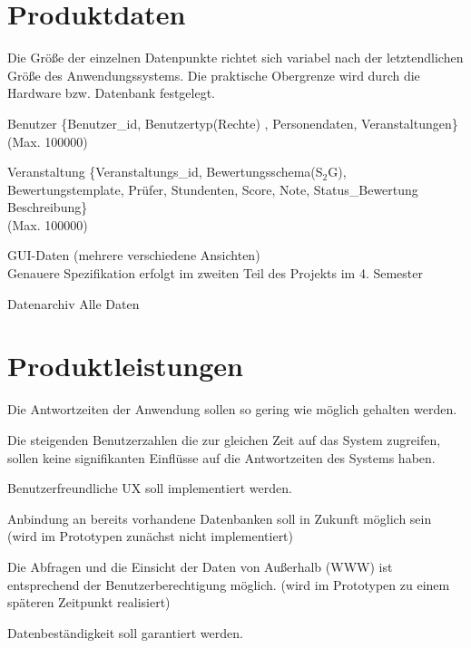 	
	
	\section{Produktdaten}
	
		Die Größe der einzelnen Datenpunkte richtet sich variabel nach der letztendlichen Größe des Anwendungssystems. Die praktische Obergrenze wird durch die Hardware bzw. Datenbank festgelegt. 
	
	\begin{description}
	\item[/D10/] Benutzer \{Benutzer\_id, Benutzertyp(Rechte) , Personendaten, Veranstaltungen\}\\ (Max. 100000) 
	\item[/D20/] Veranstaltung \{Veranstaltungs\_id, Bewertungsschema(S$_2$G), Bewertungstemplate, Prüfer, Stundenten, Score, Note, Status\_Bewertung\, Beschreibung\} \\ (Max. 100000)
	\item[/D30/] GUI-Daten (mehrere verschiedene Ansichten) \\
	Genauere Spezifikation erfolgt im zweiten Teil des Projekts im 4. Semester
	\item[/D40/] Datenarchiv {Alle Daten}
	
	\end{description}
	
	\section{Produktleistungen}
	
	\begin{description}
	\item[/L10/] Die Antwortzeiten der Anwendung sollen so gering wie möglich gehalten werden.
	\item[/L20/] 	Die steigenden Benutzerzahlen die zur gleichen Zeit auf das System zugreifen, sollen keine signifikanten Einflüsse auf die Antwortzeiten des Systems haben.
	\item[/L30/]	Benutzerfreundliche UX soll implementiert werden.
	\item[/L40/]	Anbindung an bereits vorhandene Datenbanken soll in Zukunft möglich sein (wird im Prototypen zunächst nicht implementiert)
	\item[/L50/] 	Die Abfragen und die Einsicht der Daten von Außerhalb (WWW) ist entsprechend der Benutzerberechtigung möglich. (wird im Prototypen zu einem späteren Zeitpunkt realisiert)
	\item[/L60/] 	Datenbeständigkeit soll garantiert werden.
	\end{description}


